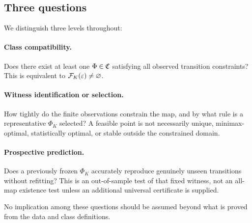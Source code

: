 \subsection{Three questions}

We distinguish three levels throughout:

\paragraph{Class compatibility.}
Does there exist at least one $\Phi\in\mathfrak C$ satisfying all observed transition constraints?  This is equivalent to $\mathcal F_K(\varepsilon)\neq\varnothing$.

\paragraph{Witness identification or selection.}
How tightly do the finite observations constrain the map, and by what rule is a representative $\Phi_K$ selected?  A feasible point is not necessarily unique, minimax-optimal, statistically optimal, or stable outside the constrained domain.

\paragraph{Prospective prediction.}
Does a previously frozen $\Phi_K$ accurately reproduce genuinely unseen transitions without refitting?  This is an out-of-sample test of that fixed witness, not an all-map existence test unless an additional universal certificate is supplied.

No implication among these questions should be assumed beyond what is proved from the data and class definitions.
